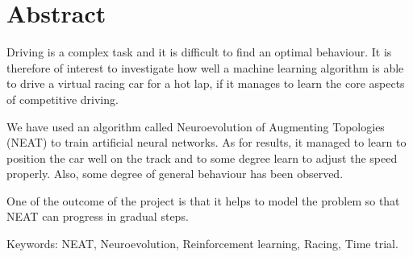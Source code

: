 \thispagestyle{plain}			%
\setlength{\parskip}{0pt plus 1.0pt}
\section*{Abstract}
Driving is a complex task and it is difficult to find an optimal behaviour. It is therefore of interest to investigate how well a machine learning algorithm is able to drive a virtual racing car for a hot lap, if it manages to learn the core aspects of competitive driving.

We have used an algorithm called Neuroevolution of Augmenting Topologies (NEAT) to train artificial neural networks. As for results, it managed to learn to position the car well on the track and to some degree learn to adjust the speed properly. Also, some degree of general behaviour has been observed.

One of the outcome of the project is that it helps to model the problem so that NEAT can progress in gradual steps.

\vfill
Keywords: NEAT, Neuroevolution, Reinforcement learning, Racing, Time trial.

\newpage				%
\thispagestyle{empty}
\mbox{}


